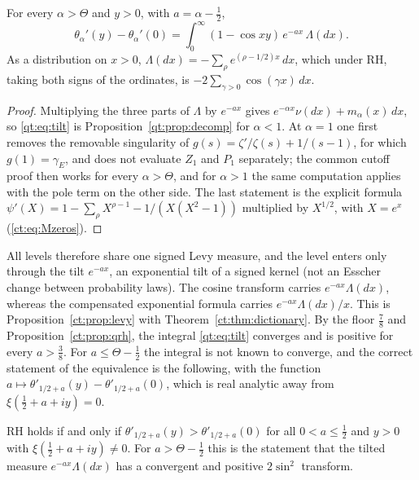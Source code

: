 \begin{theorem}[Tilting]\label{qt:thm:tilt}
For every $\alpha>\Theta$ and $y>0$, with $a=\alpha-\tfrac12$,
\begin{equation}\label{qt:eq:tilt}
\theta_\alpha'(y)-\theta_\alpha'(0)=\int_0^\infty(1-\cos xy)\,e^{-ax}\,\Lambda(dx).
\end{equation}
As a distribution on $x>0$, $\Lambda(dx)=-\sum_\rho e^{(\rho-1/2)x}\,dx$, which under RH, taking both signs of the ordinates, is $-2\sum_{\gamma>0}\cos(\gamma x)\,dx$.
\end{theorem}

\begin{proof}
Multiplying the three parts of $\Lambda$ by $e^{-ax}$ gives $e^{-\alpha x}\nu(dx)+m_\alpha(x)\,dx$, so \eqref{qt:eq:tilt} is Proposition~\ref{qt:prop:decomp} for $\alpha<1$. At $\alpha=1$ one first removes the removable singularity of $g(s)=\zeta'/\zeta(s)+1/(s-1)$, for which $g(1)=\gamma_E$, and does not evaluate $Z_1$ and $P_1$ separately; the common cutoff proof then works for every $\alpha>\Theta$, and for $\alpha>1$ the same computation applies with the pole term on the other side. The last statement is the explicit formula $\psi'(X)=1-\sum_\rho X^{\rho-1}-1/(X(X^2-1))$ multiplied by $X^{1/2}$, with $X=e^x$ (\eqref{ct:eq:Mzeros}).
\end{proof}

All levels therefore share one signed Levy measure, and the level enters only through the tilt $e^{-ax}$, an exponential tilt of a signed kernel (not an Esscher change between probability laws). The cosine transform carries $e^{-ax}\Lambda(dx)$, whereas the compensated exponential formula carries $e^{-ax}\Lambda(dx)/x$. This is Proposition~\ref{ct:prop:levy} with Theorem~\ref{ct:thm:dictionary}. By the floor $\tfrac78$ and Proposition~\ref{ct:prop:qrh}, the integral \eqref{qt:eq:tilt} converges and is positive for every $a>\tfrac38$. For $a\le\Theta-\tfrac12$ the integral is not known to converge, and the correct statement of the equivalence is the following, with the function $a\mapsto\theta'_{1/2+a}(y)-\theta'_{1/2+a}(0)$, which is real analytic away from $\xi(\tfrac12+a+iy)=0$.

\begin{corollary}\label{qt:cor:tilt}
RH holds if and only if $\theta'_{1/2+a}(y)>\theta'_{1/2+a}(0)$ for all $0<a\le\tfrac12$ and $y>0$ with $\xi(\tfrac12+a+iy)\ne0$. For $a>\Theta-\tfrac12$ this is the statement that the tilted measure $e^{-ax}\Lambda(dx)$ has a convergent and positive $2\sin^2$ transform.
\end{corollary}

